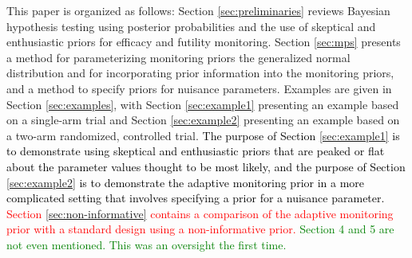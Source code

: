 \documentclass[12pt]{article}
\begin{document}
This paper is organized as follows: %
Section \ref{sec:preliminaries} reviews Bayesian hypothesis testing using posterior probabilities and the use of  skeptical and enthusiastic priors for efficacy and futility monitoring. 
%
Section \ref{sec:mps} presents a method for parameterizing monitoring priors the generalized normal distribution and for incorporating prior information into the monitoring priors, and a method to specify priors for nuisance parameters.
%
Examples are given in Section \ref{sec:examples}, with Section \ref{sec:example1} presenting an example based on a single-arm trial and Section \ref{sec:example2} presenting an example based on a two-arm randomized, controlled trial. \textcolor{black}{The purpose of Section \ref{sec:example1} is to demonstrate using skeptical and enthusiastic priors that are peaked or flat about the parameter values thought to be most likely, and the purpose of Section \ref{sec:example2} is to demonstrate the adaptive monitoring prior in a more complicated setting that involves specifying a prior for a nuisance parameter.} \textcolor{red}{Section \ref{sec:non-informative} contains a comparison of the adaptive monitoring prior with a standard design using a non-informative prior.}
\textcolor{green}{Section 4 and 5 are not even mentioned. This was an oversight the first time.}
\end{document}
